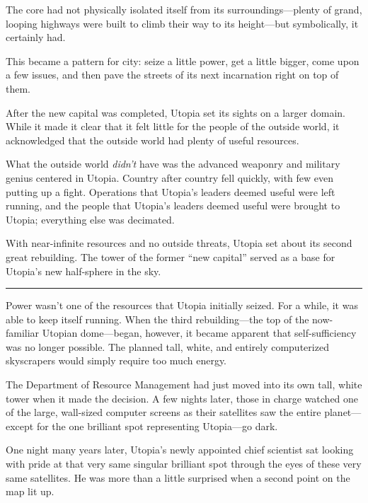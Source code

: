 \documentclass[12pt,letterpaper,oneside,english]{book}
\begin{document}
The core had not physically isolated itself from its
surroundings---plenty of grand, looping highways were built to climb
their way to its height---but symbolically, it certainly had.

This became a pattern for city: seize a little power, get a little
bigger, come upon a few issues, and then pave the streets of its next
incarnation right on top of them.

After the new capital was completed, Utopia set its sights on a larger
domain.  While it made it clear that it felt little for the people of
the outside world, it acknowledged that the outside world had plenty of
useful resources.

What the outside world \emph{didn't} have was the advanced weaponry and
military genius centered in Utopia.  Country after country fell quickly,
with few even putting up a fight.  Operations that Utopia's leaders
deemed useful were left running, and the people that Utopia's leaders
deemed useful were brought to Utopia; everything else was decimated.


With near-infinite resources and no outside threats, Utopia set about
its second great rebuilding.  The tower of the former ``new capital''
served as a base for Utopia's new half-sphere in the sky.

\medskip
{\centering\rule{\linewidth}{1pt}}
\smallskip

Power wasn't one of the resources that Utopia initially seized.  For a
while, it was able to keep itself running.  When the third
rebuilding---the top of the now-familiar Utopian dome---began, however,
it became apparent that self-sufficiency was no longer possible.  The
planned tall, white, and entirely computerized skyscrapers would simply
require too much energy.

The Department of Resource Management had just moved into its own tall,
white tower when it made the decision.  A few nights later, those in
charge watched one of the large, wall-sized computer screens as their
satellites saw the entire planet---except for the one brilliant spot
representing Utopia---go dark.

One night many years later, Utopia's newly appointed chief scientist sat
looking with pride at that very same singular brilliant spot through the
eyes of these very same satellites.  He was more than a little surprised
when a second point on the map lit up.
\end{document}
